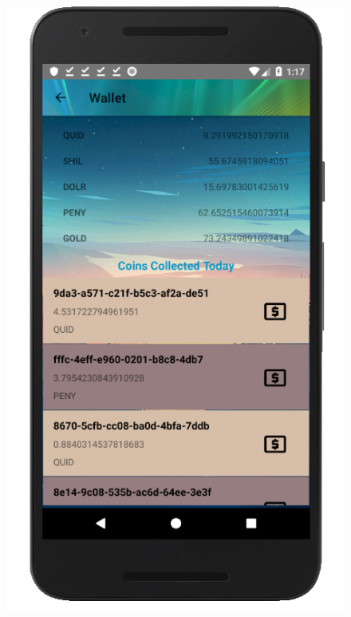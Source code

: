 \documentclass[12pt]{article}
\begin{document}
\begin{figure}
	\includegraphics[scale=0.25]{Wallet.png}

\end{figure}
\end{document}
